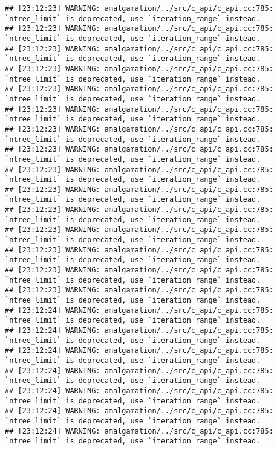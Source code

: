 \documentclass[
]{article}
\begin{document}
\begin{verbatim}
## [23:12:23] WARNING: amalgamation/../src/c_api/c_api.cc:785: `ntree_limit` is deprecated, use `iteration_range` instead.
## [23:12:23] WARNING: amalgamation/../src/c_api/c_api.cc:785: `ntree_limit` is deprecated, use `iteration_range` instead.
## [23:12:23] WARNING: amalgamation/../src/c_api/c_api.cc:785: `ntree_limit` is deprecated, use `iteration_range` instead.
## [23:12:23] WARNING: amalgamation/../src/c_api/c_api.cc:785: `ntree_limit` is deprecated, use `iteration_range` instead.
## [23:12:23] WARNING: amalgamation/../src/c_api/c_api.cc:785: `ntree_limit` is deprecated, use `iteration_range` instead.
## [23:12:23] WARNING: amalgamation/../src/c_api/c_api.cc:785: `ntree_limit` is deprecated, use `iteration_range` instead.
## [23:12:23] WARNING: amalgamation/../src/c_api/c_api.cc:785: `ntree_limit` is deprecated, use `iteration_range` instead.
## [23:12:23] WARNING: amalgamation/../src/c_api/c_api.cc:785: `ntree_limit` is deprecated, use `iteration_range` instead.
## [23:12:23] WARNING: amalgamation/../src/c_api/c_api.cc:785: `ntree_limit` is deprecated, use `iteration_range` instead.
## [23:12:23] WARNING: amalgamation/../src/c_api/c_api.cc:785: `ntree_limit` is deprecated, use `iteration_range` instead.
## [23:12:23] WARNING: amalgamation/../src/c_api/c_api.cc:785: `ntree_limit` is deprecated, use `iteration_range` instead.
## [23:12:23] WARNING: amalgamation/../src/c_api/c_api.cc:785: `ntree_limit` is deprecated, use `iteration_range` instead.
## [23:12:23] WARNING: amalgamation/../src/c_api/c_api.cc:785: `ntree_limit` is deprecated, use `iteration_range` instead.
## [23:12:23] WARNING: amalgamation/../src/c_api/c_api.cc:785: `ntree_limit` is deprecated, use `iteration_range` instead.
## [23:12:23] WARNING: amalgamation/../src/c_api/c_api.cc:785: `ntree_limit` is deprecated, use `iteration_range` instead.
## [23:12:24] WARNING: amalgamation/../src/c_api/c_api.cc:785: `ntree_limit` is deprecated, use `iteration_range` instead.
## [23:12:24] WARNING: amalgamation/../src/c_api/c_api.cc:785: `ntree_limit` is deprecated, use `iteration_range` instead.
## [23:12:24] WARNING: amalgamation/../src/c_api/c_api.cc:785: `ntree_limit` is deprecated, use `iteration_range` instead.
## [23:12:24] WARNING: amalgamation/../src/c_api/c_api.cc:785: `ntree_limit` is deprecated, use `iteration_range` instead.
## [23:12:24] WARNING: amalgamation/../src/c_api/c_api.cc:785: `ntree_limit` is deprecated, use `iteration_range` instead.
## [23:12:24] WARNING: amalgamation/../src/c_api/c_api.cc:785: `ntree_limit` is deprecated, use `iteration_range` instead.
## [23:12:24] WARNING: amalgamation/../src/c_api/c_api.cc:785: `ntree_limit` is deprecated, use `iteration_range` instead.

\end{verbatim}
\end{document}
